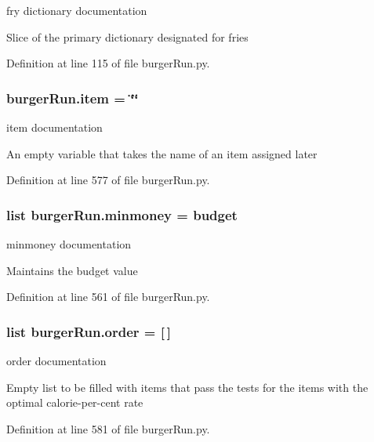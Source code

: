 fry dictionary documentation 

Slice of the primary dictionary designated for fries 

Definition at line 115 of file burger\-Run.\-py.

\hypertarget{namespaceburgerRun_a29993578410fd209e103605e36ac405c}{
\subsubsection[{item}]{\setlength{\rightskip}{0pt plus 5cm}burger\-Run.\-item = \char`\"{}\char`\"{}}}\label{namespaceburgerRun_a29993578410fd209e103605e36ac405c}


item documentation 

An empty variable that takes the name of an item assigned later 

Definition at line 577 of file burger\-Run.\-py.

\hypertarget{namespaceburgerRun_ac7a920c5121e39b1633a48f1877c044e}{
\subsubsection[{minmoney}]{\setlength{\rightskip}{0pt plus 5cm}list burger\-Run.\-minmoney = {\bf budget}}}\label{namespaceburgerRun_ac7a920c5121e39b1633a48f1877c044e}


minmoney documentation 

Maintains the budget value 

Definition at line 561 of file burger\-Run.\-py.

\hypertarget{namespaceburgerRun_a42aef842687cd63d70ff19adc706581a}{
\subsubsection[{order}]{\setlength{\rightskip}{0pt plus 5cm}list burger\-Run.\-order = \mbox{[}$\,$\mbox{]}}}\label{namespaceburgerRun_a42aef842687cd63d70ff19adc706581a}


order documentation 

Empty list to be filled with items that pass the tests for the items with the optimal calorie-\/per-\/cent rate 

Definition at line 581 of file burger\-Run.\-py.

